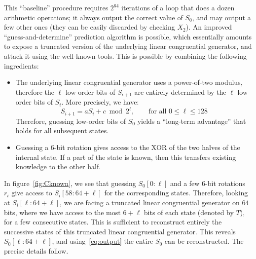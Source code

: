 \documentclass[preprint,svgnames]{iacrtrans}
\begin{document}
This ``baseline'' procedure requires $2^{64}$ iterations of a loop that does a
dozen arithmetic operations; it always output the correct value of $S_0$, and
may output a few other ones (they can be easily discarded by checking $X_2$). An
improved ``guess-and-determine'' prediction algorithm is possible, which
essentially amounts to expose a truncated version of the underlying linear
congruential generator, and attack it using the well-known tools. This is
possible by combining the following ingredients:
\begin{itemize}
\item The underlying linear congruential generator uses a power-of-two modulus,
  therefore the $\ell$ low-order bits of $S_{i+1}$ are entirely determined by
  the $\ell$ low-order bits of $S_i$. More precisely, we have:
  \begin{equation}\label{eq:lcg}
    S_{i+1} = aS_i + c \bmod 2^\ell, \qquad \text{for all } 0 \leq \ell \leq 128
  \end{equation}
  Therefore, guessing low-order bits of $S_0$ yields a ``long-term advantage''
  that holds for all subsequent states.

\item Guessing a 6-bit rotation gives access to the XOR of the two halves of the
  internal state. If a part of the state is known, then this transfers existing
  knowledge to the other half.
\end{itemize}

In figure~\ref{fig:Cknown}, we see that guessing $S_0[0:\ell]$ and a few 6-bit
rotations $r_i$ give access to $S_i[58:64+\ell]$ for the corresponding
states. Therefore, looking at $S_i[\ell:64+\ell]$, we are facing a truncated
linear congruential generator on $64$ bits, where we have access to the most
$6+\ell$ bits of each state (denoted by $T$), for a few consecutive states. This
is sufficient to reconstruct entirely the successive states of this truncated
linear congruential generator. This reveals $S_0[\ell:64+\ell]$, and
using~\eqref{eq:output} the entire $S_0$ can be reconstructed. The precise
details follow.
\end{document}
